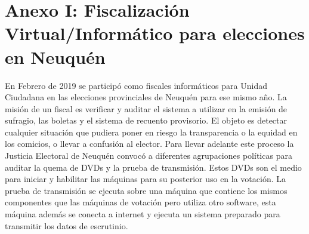 \label{Anexos}
\appendix
\clearpage
\addappheadtotoc
\appendixpage
\chapter[Anexo I: Fisc. Virtual/Inf. para elecciones en Neuquén]{Anexo I: Fiscalización Virtual/Informático para elecciones en Neuquén}
En Febrero de 2019 se participó como fiscales informáticos para Unidad Ciudadana en las elecciones provinciales de Neuquén para ese mismo año. La misión de un fiscal es verificar y auditar el sistema a utilizar en la emisión de sufragio, las boletas y el sistema de recuento provisorio. El objeto es detectar cualquier situación que pudiera poner en riesgo la transparencia o la equidad en los comicios, o llevar a confusión al elector. Para llevar adelante este proceso la Justicia Electoral de Neuquén convocó a diferentes agrupaciones políticas para auditar la quema de DVDs y la prueba de transmisión. Estos DVDs son el medio para iniciar y habilitar las máquinas para su posterior uso en la votación. La prueba de transmisión se ejecuta sobre una máquina que contiene los mismos componentes que las máquinas de votación pero utiliza otro software, esta máquina además se conecta a internet y ejecuta un sistema preparado para transmitir los datos de escrutinio. 

